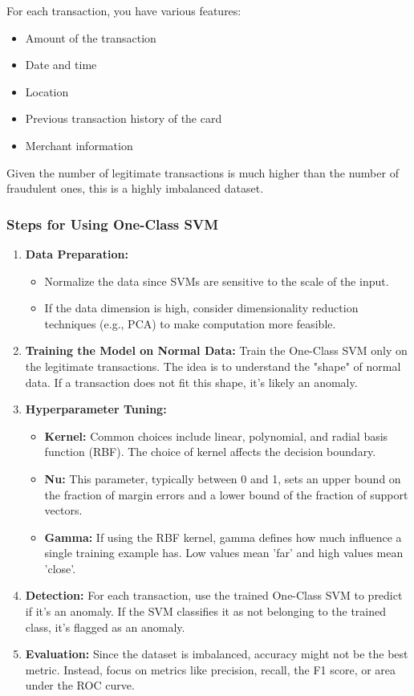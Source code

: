 For each transaction, you have various features:
\begin{itemize}
    \item Amount of the transaction
    \item Date and time
    \item Location
    \item Previous transaction history of the card
    \item Merchant information
\end{itemize}

Given the number of legitimate transactions is much higher than the number of fraudulent ones, this is a highly imbalanced dataset.

\subsubsection*{Steps for Using One-Class SVM}

\begin{enumerate}
    \item \textbf{Data Preparation:}
    \begin{itemize}
        \item Normalize the data since SVMs are sensitive to the scale of the input.
        \item If the data dimension is high, consider dimensionality reduction techniques (e.g., PCA) to make computation more feasible.
    \end{itemize}

    \item \textbf{Training the Model on Normal Data:} 
    Train the One-Class SVM only on the legitimate transactions. The idea is to understand the "shape" of normal data. If a transaction does not fit this shape, it's likely an anomaly.

    \item \textbf{Hyperparameter Tuning:}
    \begin{itemize}
        \item \textbf{Kernel:} Common choices include linear, polynomial, and radial basis function (RBF). The choice of kernel affects the decision boundary.
        \item \textbf{Nu:} This parameter, typically between 0 and 1, sets an upper bound on the fraction of margin errors and a lower bound of the fraction of support vectors.
        \item \textbf{Gamma:} If using the RBF kernel, gamma defines how much influence a single training example has. Low values mean 'far' and high values mean 'close'.
    \end{itemize}

    \item \textbf{Detection:} For each transaction, use the trained One-Class SVM to predict if it's an anomaly. If the SVM classifies it as not belonging to the trained class, it's flagged as an anomaly.

    \item \textbf{Evaluation:} Since the dataset is imbalanced, accuracy might not be the best metric. Instead, focus on metrics like precision, recall, the F1 score, or area under the ROC curve.
\end{enumerate}

